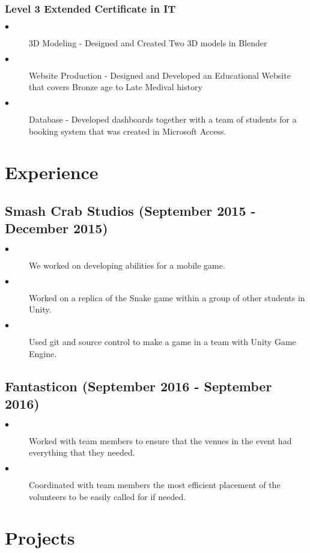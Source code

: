\documentclass{article}
\begin{document}
\begin{multicols}{2}
        \subsubsection{Level 3 Extended Certificate in IT}
        \begin{description}
            \item[$\bullet$]3D Modeling - Designed and Created Two 3D models in Blender
            \item[$\bullet$]Website Production - Designed and Developed an Educational Website that covers Bronze age to Late Medival history 
            \item[$\bullet$]Database - Developed dashboards together with a team of students for a booking system that was created in Microsoft Access. 
        \end{description}
    \section{Experience}
        \subsection{Smash Crab Studios (September 2015 - December 2015)} 
        \begin{description}
            \item[$\bullet$]We worked on developing abilities for a mobile game.
            \item[$\bullet$]Worked on a replica of the Snake game within a group of other students in Unity. 
            \item[$\bullet$]Used git and source control to make a game in a team with Unity Game Engine.
        \end{description}
        \subsection{Fantasticon (September 2016 - September 2016)} 
        \begin{description}
            \item[$\bullet$]Worked with team members to ensure that the venues in the event had everything that they needed.
            \item[$\bullet$]Coordinated with team members the most efficient placement of the volunteers to be easily called for if needed.
        \end{description}
        \columnbreak
    \section{Projects}

\end{multicols}
\end{document}
